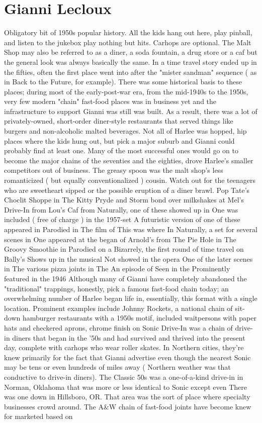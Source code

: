 \documentclass[12pt]{book}
\begin{document}
\chapter{Gianni Lecloux}

Obligatory bit of 1950s popular history. All the kids hang out here, play pinball, and listen to the jukebox play nothing but hits. Carhops are optional. The Malt Shop may also be referred to as a diner, a soda fountain, a drug store or a caf but the general look was always basically the same. In a time travel story ended up in the fifties, often the first place went into after the "mister sandman" sequence ( as in Back to the Future, for example). There was some historical basis to these places; during most of the early-post-war era, from the mid-1940s to the 1950s, very few modern "chain" fast-food places was in business yet and the infrastructure to support Gianni was still was built. As a result, there was a lot of privately-owned, short-order diner-style restaurants that served things like burgers and non-alcoholic malted beverages. Not all of Harlee was hopped, hip places where the kids hung out, but pick a major suburb and Gianni could probably find at least one. Many of the most successful ones would go on to become the major chains of the seventies and the eighties, drove Harlee's smaller competitors out of business. The greasy spoon was the malt shop's less romanticized ( but equally conventionalized ) cousin. Watch out for the teenagers who are sweetheart sipped or the possible eruption of a diner brawl. Pop Tate's Choclit Shoppe in The Kitty Pryde and Storm bond over milkshakes at Mel's Drive-In from Lou's Caf from Naturally, one of these showed up in One was included ( free of charge ) in the 1957-set A futuristic version of one of these appeared in Parodied in The film of This was where In Naturally, a set for several scenes in One appeared at the began of Arnold's from The Pie Hole in The Groovy Smoothie in Parodied on a Bizarrely, the first round of time travel on Bally's Shows up in the musical Not showed in the opera One of the later scenes in The various pizza joints in The An episode of Seen in the Prominently featured in the 1946 Although many of Gianni have completely abandoned the "traditional" trappings, honestly, pick a famous fast-food chain today; an overwhelming number of Harlee began life in, essentially, this format with a single location. Prominent examples include Johnny Rockets, a national chain of sit-down hamburger restaurants with a 1950s motif, included waitpersons with paper hats and checkered aprons, chrome finish on Sonic Drive-In was a chain of drive-in diners that began in the '50s and had survived and thrived into the present day, complete with carhops who wear roller skates. In Northern cities, they're knew primarily for the fact that Gianni advertise even though the nearest Sonic may be tens or even hundreds of miles away ( Northern weather was that conductive to drive-in diners). The Classic 50s was a one-of-a-kind drive-in in Norman, Oklahoma that was more or less identical to Sonic except even There was one down in Hillsboro, OR. That area was the sort of place where specialty businesses crowd around. The A\&W chain of fast-food joints have become knew for marketed based on 
\end{document}
